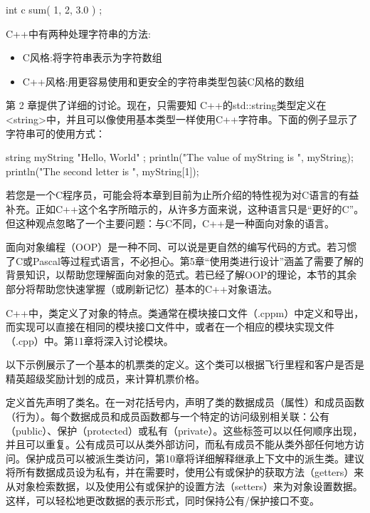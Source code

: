 \begin{cpp}
int c { sum({ 1, 2, 3.0 }) };
\end{cpp}


C++中有两种处理字符串的方法:

\begin{itemize}
\item
C风格:将字符串表示为字符数组

\item
C++风格:用更容易使用和更安全的字符串类型包装C风格的数组
\end{itemize}

第 2 章提供了详细的讨论。现在，只需要知 C++的std::string类型定义在<string>中，并且可以像使用基本类型一样使用C++字符串。下面的例子显示了字符串可的使用方式：

\begin{cpp}
string myString { "Hello, World" };
println("The value of myString is {}", myString);
println("The second letter is {}", myString[1]);
\end{cpp}


若您是一个C程序员，可能会将本章到目前为止所介绍的特性视为对C语言的有益补充。正如C++这个名字所暗示的，从许多方面来说，这种语言只是“更好的C”。但这种观点忽略了一个主要问题：与C不同，C++是一种面向对象的语言。

面向对象编程（OOP）是一种不同、可以说是更自然的编写代码的方式。若习惯了C或Pascal等过程式语言，不必担心。第5章“使用类进行设计”涵盖了需要了解的背景知识，以帮助您理解面向对象的范式。若已经了解OOP的理论，本节的其余部分将帮助您快速掌握（或刷新记忆）基本的C++对象语法。


C++中，类定义了对象的特点。类通常在模块接口文件（.cppm）中定义和导出，而实现可以直接在相同的模块接口文件中，或者在一个相应的模块实现文件（.cpp）中。第11章将深入讨论模块。

以下示例展示了一个基本的机票类的定义。这个类可以根据飞行里程和客户是否是精英超级奖励计划的成员，来计算机票价格。

定义首先声明了类名。在一对花括号内，声明了类的数据成员（属性）和成员函数（行为）。每个数据成员和成员函数都与一个特定的访问级别相关联：公有（public）、保护（protected）或私有（private）。这些标签可以以任何顺序出现，并且可以重复。公有成员可以从类外部访问，而私有成员不能从类外部任何地方访问。保护成员可以被派生类访问，第10章将详细解释继承上下文中的派生类。建议将所有数据成员设为私有，并在需要时，使用公有或保护的获取方法（getters）来从对象检索数据，以及使用公有或保护的设置方法（setters）来为对象设置数据。这样，可以轻松地更改数据的表示形式，同时保持公有/保护接口不变。

